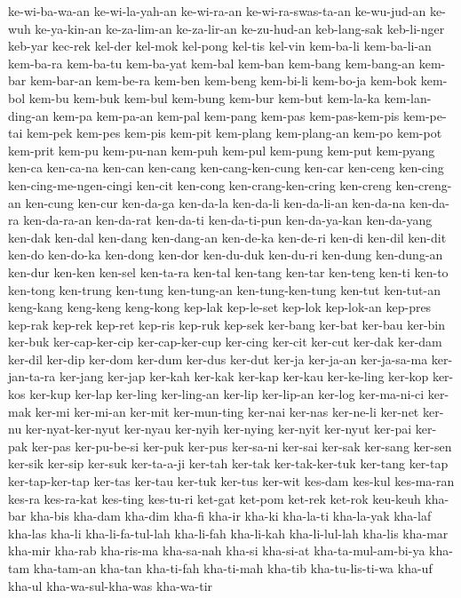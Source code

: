 {ke-wi-ba-wa-an ke-wi-la-yah-an ke-wi-ra-an ke-wi-ra-swas-ta-an
ke-wu-jud-an ke-wuh ke-ya-kin-an ke-za-lim-an ke-za-lir-an ke-zu-hud-an
keb-lang-sak keb-li-nger keb-yar kec-rek kel-der kel-mok kel-pong kel-tis
kel-vin kem-ba-li kem-ba-li-an kem-ba-ra kem-ba-tu kem-ba-yat kem-bal
kem-ban kem-bang kem-bang-an kem-bar kem-bar-an kem-be-ra kem-ben kem-beng
kem-bi-li kem-bo-ja kem-bok kem-bol kem-bu kem-buk kem-bul kem-bung
kem-bur kem-but kem-la-ka kem-lan-ding-an kem-pa kem-pa-an kem-pal
kem-pang kem-pas kem-pas-kem-pis kem-pe-tai kem-pek kem-pes kem-pis
kem-pit kem-plang kem-plang-an kem-po kem-pot kem-prit kem-pu kem-pu-nan
kem-puh kem-pul kem-pung kem-put kem-pyang ken-ca ken-ca-na ken-can
ken-cang ken-cang-ken-cung ken-car ken-ceng ken-cing
ken-cing-me-ngen-cingi ken-cit ken-cong ken-crang-ken-cring ken-creng
ken-creng-an ken-cung ken-cur ken-da-ga ken-da-la ken-da-li ken-da-li-an
ken-da-na ken-da-ra ken-da-ra-an ken-da-rat ken-da-ti ken-da-ti-pun
ken-da-ya-kan ken-da-yang ken-dak ken-dal ken-dang ken-dang-an ken-de-ka
ken-de-ri ken-di ken-dil ken-dit ken-do ken-do-ka ken-dong ken-dor
ken-du-duk ken-du-ri ken-dung ken-dung-an ken-dur ken-ken ken-sel
ken-ta-ra ken-tal ken-tang ken-tar ken-teng ken-ti ken-to ken-tong
ken-trung ken-tung ken-tung-an ken-tung-ken-tung ken-tut ken-tut-an
keng-kang keng-keng keng-kong kep-lak kep-le-set kep-lok kep-lok-an
kep-pres kep-rak kep-rek kep-ret kep-ris kep-ruk kep-sek ker-bang ker-bat
ker-bau ker-bin ker-buk ker-cap-ker-cip ker-cap-ker-cup ker-cing ker-cit
ker-cut ker-dak ker-dam ker-dil ker-dip ker-dom ker-dum ker-dus ker-dut
ker-ja ker-ja-an ker-ja-sa-ma ker-jan-ta-ra ker-jang ker-jap ker-kah
ker-kak ker-kap ker-kau ker-ke-ling ker-kop ker-kos ker-kup ker-lap
ker-ling ker-ling-an ker-lip ker-lip-an ker-log ker-ma-ni-ci ker-mak
ker-mi ker-mi-an ker-mit ker-mun-ting ker-nai ker-nas ker-ne-li ker-net
ker-nu ker-nyat-ker-nyut ker-nyau ker-nyih ker-nying ker-nyit ker-nyut
ker-pai ker-pak ker-pas ker-pu-be-si ker-puk ker-pus ker-sa-ni ker-sai
ker-sak ker-sang ker-sen ker-sik ker-sip ker-suk ker-ta-a-ji ker-tah
ker-tak ker-tak-ker-tuk ker-tang ker-tap ker-tap-ker-tap ker-tas ker-tau
ker-tuk ker-tus ker-wit kes-dam kes-kul kes-ma-ran kes-ra kes-ra-kat
kes-ting kes-tu-ri ket-gat ket-pom ket-rek ket-rok keu-keuh kha-bar
kha-bis kha-dam kha-dim kha-fi kha-ir kha-ki kha-la-ti kha-la-yak kha-laf
kha-las kha-li kha-li-fa-tul-lah kha-li-fah kha-li-kah kha-li-lul-lah
kha-lis kha-mar kha-mir kha-rab kha-ris-ma kha-sa-nah kha-si kha-si-at
kha-ta-mul-am-bi-ya kha-tam kha-tam-an kha-tan kha-ti-fah kha-ti-mah
kha-tib kha-tu-lis-ti-wa kha-uf kha-ul kha-wa-sul-kha-was kha-wa-tir
}
